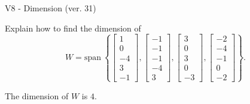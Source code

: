 \begin{exercise}
  \begin{exerciseTitle}V8 - Dimension (ver. 31)\end{exerciseTitle}
  \begin{exerciseStatement}
    Explain how to find the dimension of 
\[W=\mathrm{span}\ \left\{\left[\begin{array}{r}
1 \\
0 \\
-4 \\
3 \\
-1
\end{array}\right] , \left[\begin{array}{r}
-1 \\
-1 \\
-1 \\
-4 \\
3
\end{array}\right] , \left[\begin{array}{r}
3 \\
0 \\
3 \\
0 \\
-3
\end{array}\right] , \left[\begin{array}{r}
-2 \\
-4 \\
-1 \\
0 \\
-2
\end{array}\right]\right\}.\]



  \end{exerciseStatement}
  \begin{exerciseAnswer}
   The dimension of \(W\) is  \(4\).
  


  \end{exerciseAnswer}
\end{exercise}